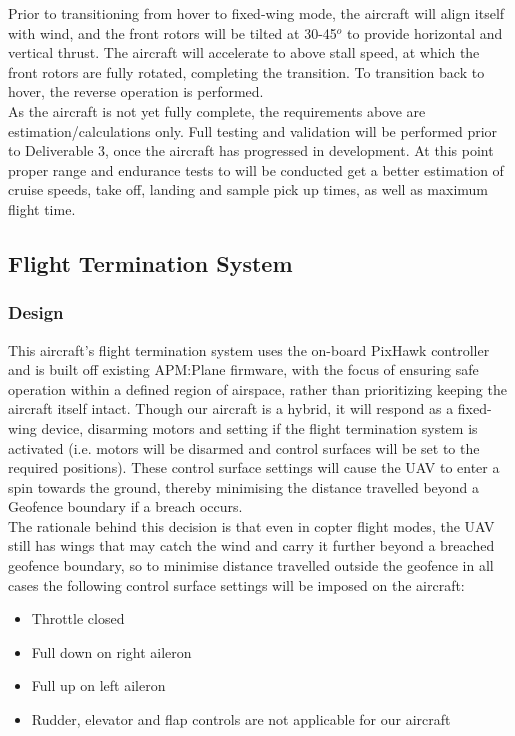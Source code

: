 Prior to transitioning from hover to fixed-wing mode, the aircraft will align itself with wind, and the front rotors will be tilted at 30-45$^o$ to provide horizontal and vertical thrust. The aircraft will accelerate to above stall speed, at which the front rotors are fully rotated, completing the transition. To transition back to hover, the reverse operation is performed.\\

As the aircraft is not yet fully complete, the requirements above are estimation/calculations only. Full testing and validation will be performed prior to Deliverable 3, once the aircraft has progressed in development. At this point proper range and endurance tests to will be conducted get a better estimation of cruise speeds, take off, landing and sample pick up times, as well as maximum flight time.

\subsection{Flight Termination System}
\subsubsection{Design}
This aircraft’s flight termination system uses the on-board PixHawk controller and is built off existing APM:Plane firmware, with the focus of ensuring safe operation within a defined region of airspace, rather than prioritizing keeping the aircraft itself intact. Though our aircraft is a hybrid, it will respond as a fixed-wing device, disarming motors and setting  if the flight termination system is activated (i.e. motors will be disarmed and control surfaces will be set to the required positions). These control surface settings will cause the UAV to enter a spin towards the ground, thereby minimising the distance travelled beyond a Geofence boundary if a breach occurs.\\

The rationale behind this decision is that even in copter flight modes, the UAV still has wings that may catch the wind and carry it further beyond a breached geofence boundary, so to minimise distance travelled outside the geofence in all cases the following control surface settings will be imposed on the aircraft:
\begin{itemize}
	\item Throttle closed
	\item Full down on right aileron
	\item Full up on left aileron
	\item Rudder, elevator and flap controls are not applicable for our aircraft
\end{itemize}

